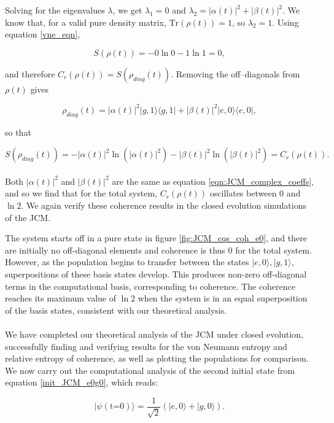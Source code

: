 \documentclass[11pt]{article}
\begin{document}
Solving for the eigenvalues $\lambda$, we get $\lambda_1 = 0$ and $\lambda_2 = |\alpha(t)|^2 + |\beta(t)|^2$. We know that, for a valid pure density matrix, $\text{Tr}(\rho(t)) = 1$, so $\lambda_2 = 1$. Using equation \eqref{vne_eqn},

\begin{equation*}
    S(\rho(t)) = - 0 \ln0 - 1\ln1 = 0, 
\end{equation*}

and therefore $C_r(\rho(t)) = S(\rho_{diag}(t))$. Removing the off--diagonals from $\rho(t)$ gives

\begin{equation*}
    \rho_{diag}(t) = |\alpha(t)|^2|g,1\rangle\langle g,1| + |\beta(t)|^2|e,0\rangle\langle e,0|,
\end{equation*}

so that

\begin{equation*}
    S(\rho_{diag}(t)) = - |\alpha(t)|^2\ln(|\alpha(t)|^2) - |\beta(t)|^2\ln(|\beta(t)|^2) = C_r(\rho(t)).
\end{equation*}
\\
Both $|\alpha(t)|^2$ and $|\beta(t)|^2$ are the same as equation \eqref{eqn:JCM_complex_coeffs}, and so we find that for the total system, $C_r(\rho(t))$
oscillates between $0$ and $\ln2$. We again verify these coherence results in the closed evolution simulations of the JCM.

The system starts off in a pure state in figure \ref{fig:JCM_cqs_coh_e0}, and there are initially no off-diagonal elements and coherence is thus 0 for the total system. However, as the population begins to transfer between the states $|e,0\rangle,|g,1\rangle$, superpositions of these basis states develop. This produces non-zero off-diagonal terms in the computational basis, corresponding to coherence. The coherence reaches its maximum value of $\ln2$ when the system is in an equal superposition of the basis states, consistent with our theoretical analysis. \\
\\
We have completed our theoretical analysis of the JCM under closed evolution, successfully finding and verifying results for the von Neumann entropy and relative entropy of coherence, as well as plotting the populations for comparison. We now carry out the computational analysis of the second initial state from equation \eqref{init_JCM_e0g0}, which reads:

\begin{equation*}
    |\psi (\text{t=0})\rangle = \frac{1}{\sqrt{2}}(|e, 0\rangle + |g,0\rangle).
\end{equation*}
\end{document}
